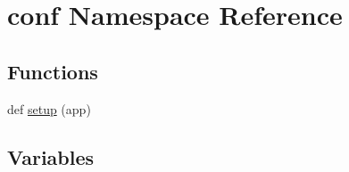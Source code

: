 \hypertarget{namespaceconf}{}\section{conf Namespace Reference}
\label{namespaceconf}
\subsection*{Functions}
\begin{DoxyCompactItemize}
\item 
def \mbox{\hyperlink{namespaceconf_ab10c3cab2b831ad54a5b330ce0f414e0}{setup}} (app)
\end{DoxyCompactItemize}
\subsection*{Variables}
